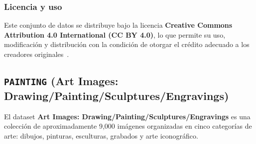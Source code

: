 \subsubsection{Licencia y uso}
Este conjunto de datos se distribuye bajo la licencia
\textbf{Creative Commons Attribution 4.0 International (CC BY 4.0)}, lo que permite su uso, modificación y distribución
con la condición de otorgar el crédito adecuado a los creadores originales~\cite{moroneyLaurenceMoroneyAI}.


\subsection{\texttt{PAINTING} (Art Images: Drawing/Painting/Sculptures/Engravings)}\label{subsec:painting}
El dataset \textbf{Art Images: Drawing/Painting/Sculptures/Engravings} es una colección de aproximadamente 9,000
imágenes organizadas en cinco categorías de arte: dibujos, pinturas, esculturas, grabados y arte iconográfico.

